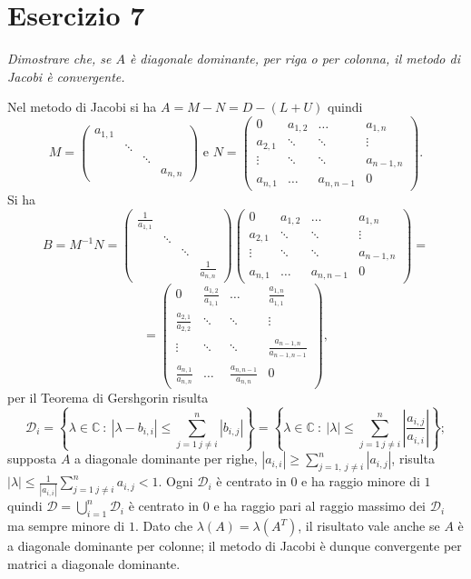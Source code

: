 \section{Esercizio 7}
\label{sub:es7}
\emph{Dimostrare che, se $A$ è diagonale dominante, per riga o per colonna, il metodo di Jacobi è convergente.}
\begin{sol}
  Nel metodo di Jacobi si ha $A=M-N=D-(L+U)$ quindi
   $$M=\begin{pmatrix}a_{1,1}&&&\\&\ddots&&\\&&\ddots&\\&&&a_{n,n}\end{pmatrix}\mbox{ e } N=\begin{pmatrix}0&a_{1,2}&\ldots&a_{1,n}\\a_{2,1}&\ddots&\ddots&\vdots\\\vdots&\ddots&\ddots&a_{n-1,n}\\a_{n,1}&\ldots&a_{n,n-1}&0\end{pmatrix}.$$
   Si ha $$B=M^{-1}N=\begin{pmatrix}\frac{1}{a_{1,1}}&&&\\&\ddots&&\\&&\ddots&\\&&&\frac{1}{a_{n,n}}\end{pmatrix}\begin{pmatrix}0&a_{1,2}&\ldots&a_{1,n}\\a_{2,1}&\ddots&\ddots&\vdots\\\vdots&\ddots&\ddots&a_{n-1,n}\\
   a_{n,1}&\ldots&a_{n,n-1}&0\end{pmatrix}=$$$$=\begin{pmatrix}0&\frac{a_{1,2}}{a_{1,1}}&\ldots&\frac{a_{1,n}}{a_{1,1}}\\\frac{a_{2,1}}{a_{2,2}}&\ddots&\ddots&\vdots\\\vdots&\ddots&\ddots&\frac{a_{n-1,n}}{a_{n-1,n-1}}\\\frac{a_{n,1}}{a_{n,n}}&\ldots&\frac{a_{n,n-1}}{a_{n,n}}&0\end{pmatrix},$$
   per il Teorema di Gershgorin risulta
   $$\mathcal{D}_i=\left\{\lambda\in\mathbb{C}\::\:|\lambda-b_{i,i}|\leq\sum_{j=1\: j\neq i}^{n}{|b_{i,j}|}\right\}=\left\{\lambda\in\mathbb{C}\::\:|\lambda|\leq\sum_{j=1\: j\neq i}^{n}{\left|\frac{a_{i,j}}{a_{i,i}}\right|}\right\};$$
   supposta $A$ a diagonale dominante per righe, $|a_{i,i}|\geq\sum_{j=1,\: j\neq i}^n{|a_{i,j}|}$,
   risulta $|\lambda|\leq\frac{1}{|a_{i,i}|}\sum_{j=1\: j\neq i}^{n}{a_{i,j}}<1$. Ogni $\mathcal{D}_i$ è centrato in $0$ e ha raggio minore di $1$ quindi $\mathcal{D}=\bigcup_{i=1}^{n}{\mathcal{D}_i}$ è centrato in $0$ e ha raggio pari al raggio massimo dei $\mathcal{D}_i$ ma sempre minore di $1$. Dato che $\lambda(A)=\lambda(A^T)$,
   il risultato vale anche se $A$ è a diagonale dominante per colonne; il metodo di Jacobi è dunque convergente per matrici a diagonale dominante.
\end{sol}

